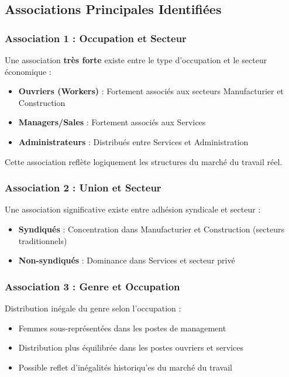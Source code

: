 \documentclass[12pt,a4paper]{report}
\begin{document}
\subsection{Associations Principales Identifiées}

\subsubsection{Association 1 : Occupation et Secteur}

Une association \textbf{très forte} existe entre le type d'occupation et le secteur économique :

\begin{itemize}
    \item \textbf{Ouvriers (Workers)} : Fortement associés aux secteurs Manufacturier et Construction
    \item \textbf{Managers/Sales} : Fortement associés aux Services
    \item \textbf{Administrateurs} : Distribués entre Services et Administration
\end{itemize}

Cette association reflète logiquement les structures du marché du travail réel.

\subsubsection{Association 2 : Union et Secteur}

Une association significative existe entre adhésion syndicale et secteur :

\begin{itemize}
    \item \textbf{Syndiqués} : Concentration dans Manufacturier et Construction (secteurs traditionnels)
    \item \textbf{Non-syndiqués} : Dominance dans Services et secteur privé
\end{itemize}

\subsubsection{Association 3 : Genre et Occupation}

Distribution inégale du genre selon l'occupation :

\begin{itemize}
    \item Femmes sous-représentées dans les postes de management
    \item Distribution plus équilibrée dans les postes ouvriers et services
    \item Possible reflet d'inégalités historiqu'es du marché du travail
\end{itemize}
\end{document}
